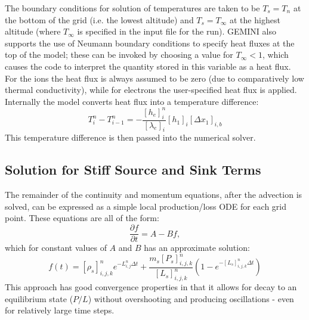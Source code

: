 \documentclass[11pt,letterpaper]{article}
\begin{document}
The boundary conditions for solution of temperatures are taken to be $T_s=T_n$ at the bottom of the grid (i.e. the lowest altitude) and $T_s=T_\infty$ at the highest altitude (where $T_\infty$ is specified in the input file for the run).  GEMINI also supports the use of Neumann boundary conditions to specify heat fluxes at the top of the model; these can be invoked by choosing a value for $T_\infty<1$, which causes the code to interpret the quantity stored in this variable as a heat flux.  For the ions the heat flux is always assumed to be zero (due to comparatively low thermal conductivity), while for electrons the user-specified heat flux is applied.  Internally the model converts heat flux into a temperature difference:
\begin{equation}
  T_i^n - T_{i-1}^n = - \frac{[h_e]_i^n}{[\lambda_e]_i} [h_1]_i [\Delta x_1]_{i,b}
\end{equation}
This temperature difference is then passed into the numerical solver.


\subsection{Solution for Stiff Source and Sink Terms} \label{sec:numstiffsource}

The remainder of the continuity and momentum equations, after the advection is solved, can be expressed as a simple local production/loss ODE for each grid point.  These equations are all of the form:
\begin{equation}
\frac{\partial f}{\partial t} = A - B f, 
\end{equation}
which for constant values of $A$ and $B$ has an approximate solution:
\begin{equation}
f(t) = \left[ \rho_s \right]_{i,j,k}^n e^{-L_{i,j}^n \Delta t} + \frac{m_s \left[ P_s \right]_{i,j,k}^n}{\left[ L_s \right]_{i,j,k}^n} \left( 1 - e^{-\left[ L_s \right]_{i,j,k}^n \Delta t} \right) \label{conSSsoln}
\end{equation}
This approach has good convergence properties in that it allows for decay to an equilibrium state ($P/L$) without overshooting and producing oscillations - even for relatively large time steps.  %
\end{document}
